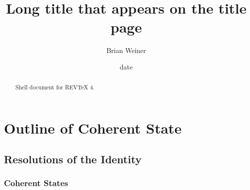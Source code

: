 \documentclass[aps,preprint]{revtex4}
\begin{document}
\preprint{}
\title[Planned]{Long title that appears on the title page}
\author{Brian Weiner}
\author{}
\author{}

\begin{abstract}
Shell document for REV\TeX{} 4.
\end{abstract}

\date[Date text]{date}
\endpage{}
\maketitle
\tableofcontents

\section{Outline of Coherent State}

\subsection{Resolutions of the Identity}

\subsubsection{Coherent States}
\end{document}
